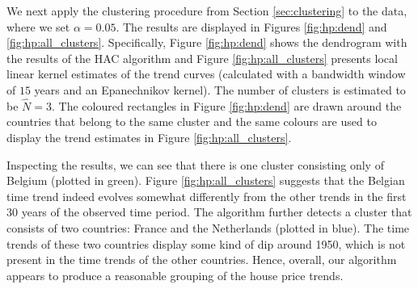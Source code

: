 \documentclass[12pt]{article}
\begin{document}
We next apply the clustering procedure from Section \ref{sec:clustering} to the data, where we set $\alpha = 0.05$. The results are displayed in Figures \ref{fig:hp:dend} and \ref{fig:hp:all_clusters}. Specifically, Figure \ref{fig:hp:dend} shows the dendrogram with the results of the HAC algorithm and Figure \ref{fig:hp:all_clusters} presents local linear kernel estimates of the trend curves (calculated with a bandwidth window of $15$ years and an Epanechnikov kernel). The number of clusters is estimated to be $\widehat{N} = 3$. The coloured rectangles in Figure \ref{fig:hp:dend} are drawn around the countries that belong to the same cluster and the same colours are used to display the trend estimates in Figure \ref{fig:hp:all_clusters}.


Inspecting the results, we can see that there is one cluster consisting only of Belgium (plotted in green). Figure \ref{fig:hp:all_clusters} suggests that the Belgian time trend indeed evolves somewhat differently from the other trends in the first $30$ years of the observed time period. %
The algorithm further detects a cluster that consists of two countries: France and the Netherlands (plotted in blue). The time trends of these two countries display some kind of dip around 1950, which is not present in the time trends of the other countries. 
Hence, overall, our algorithm appears to produce a reasonable grouping of the house price trends.




{\small
\setlength{\bibsep}{0.55em}
}
\end{document}
